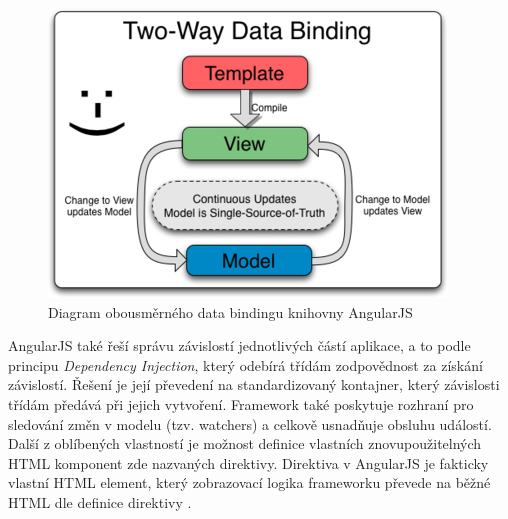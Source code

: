 \begin{figure}[h]
\begin{centering}
\includegraphics[scale=0.65]{obrazky/twoway_databinding}
\par\end{centering}
\caption{Diagram obousměrného data bindingu knihovny AngularJS \cite{angular} \label{fig:twoway-angular}}
\end{figure}
\FloatBarrier

AngularJS také řeší správu závislostí jednotlivých částí aplikace, a to podle principu \textit{Dependency Injection}, který odebírá třídám zodpovědnost za získání závislostí. Řešení je její převedení na standardizovaný kontajner, který závislosti třídám předává při jejich vytvoření. Framework také poskytuje rozhraní pro sledování změn v modelu (tzv. watchers) a celkově usnadňuje obsluhu událostí. Další z oblíbených vlastností je možnost definice vlastních znovupoužitelných HTML komponent zde nazvaných direktivy. Direktiva v AngularJS je fakticky vlastní HTML element, který zobrazovací logika frameworku převede na běžné HTML dle definice direktivy \cite{angular}.

